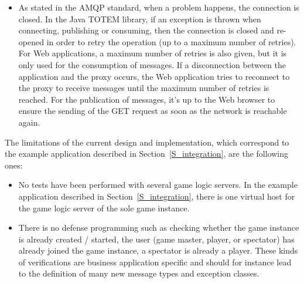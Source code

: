 \begin{itemize}
\item As stated in the AMQP standard, when a problem
  happens, the connection is closed. In the Java
  TOTEM library, if an exception is thrown when connecting, publishing
  or consuming, then the connection is closed and re-opened in order
  to retry the operation (up to a maximum number of retries).
  For Web applications, a maximum number of retries is also given, but
  it is only used for the consumption of messages. If a disconnection 
  between the application and the proxy occurs, the Web application tries to
  reconnect to the proxy to receive messages until the maximum number of 
retries is reached. For the publication
  of messages, it's up to the Web browser to ensure the sending of the GET 
  request as soon as the network is reachable again.

\end{itemize}

The limitations of the current design and implementation, which
correspond to the example application described in
Section~\ref{S_integration}, are the following ones:
\begin{itemize}
\item No tests have been performed with several game logic servers. In
  the example application described in Section~\ref{S_integration},
  there is one virtual host for the game logic server of the sole game
  instance.
\item There is no defense programming such as checking whether the
  game instance is already created / started, the user (game master,
  player, or spectator) has already joined the game instance, a
  spectator is already a player. These kinds of verifications are business
application specific and should
  for instance lead to the definition of many new message types and
  exception classes.
\end{itemize}

\endinput
